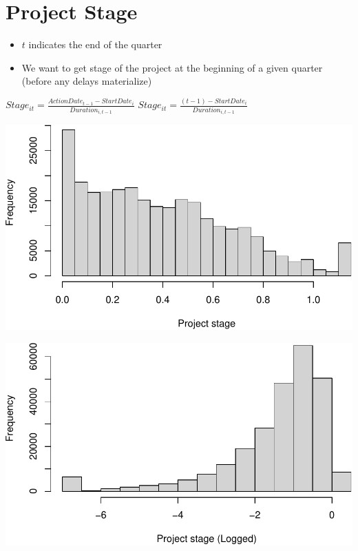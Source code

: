 \documentclass[
]{article}
\providecommand{\tightlist}{%
  \setlength{\itemsep}{0pt}\setlength{\parskip}{0pt}}
\begin{document}
\hypertarget{project-stage}{%
\section{Project Stage}\label{project-stage}}

\begin{itemize}
\tightlist
\item
  \(t\) indicates the end of the quarter
\item
  We want to get stage of the project at the beginning of a given
  quarter (before any delays materialize)
\end{itemize}

\(Stage_{it}=\frac{ActionDate_{t-1}-StartDate_i}{Duration_{i,t-1}}\)
\(Stage_{it}=\frac{(t-1)-StartDate_i}{Duration_{i,t-1}}\)

\includegraphics{qp_first_pc_delay-2_files/figure-latex/stage_plots_1-1.pdf}

\includegraphics{qp_first_pc_delay-2_files/figure-latex/stage_plots_2-1.pdf}
\end{document}

